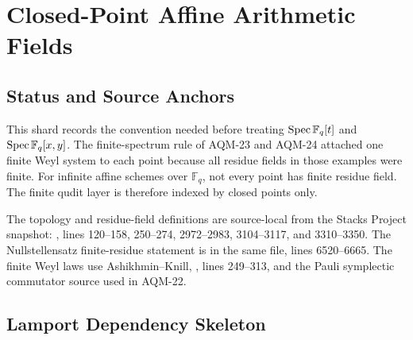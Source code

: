 
\section{Closed-Point Affine Arithmetic Fields}
\label{sec:closed-point-affine-arithmetic-fields}

\subsection{Status and Source Anchors}

This shard records the convention needed before treating
\(\operatorname{Spec}\mathbb F_q[t]\) and \(\operatorname{Spec}\mathbb F_q[x,y]\).  The finite-spectrum
rule of AQM-23 and AQM-24 attached one finite Weyl system to each point because
all residue fields in those examples were finite.  For infinite affine schemes
over \(\mathbb F_q\), not every point has finite residue field.  The finite
qudit layer is therefore indexed by closed points only.

The topology and residue-field definitions are source-local from the Stacks
Project snapshot:
, lines
120--158, 250--274, 2972--2983, 3104--3117, and 3310--3350.  The
Nullstellensatz finite-residue statement is in the same file, lines
6520--6665.  The finite Weyl laws use Ashikhmin--Knill,
,
lines 249--313, and the Pauli symplectic commutator source used in AQM-22.

\subsection{Lamport Dependency Skeleton}

